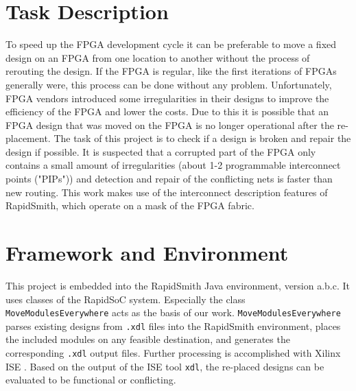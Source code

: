 \section{Task Description}
\label{sec:taskdescription}
To speed up the FPGA development cycle it can be preferable to move a fixed design on an FPGA from one location to another without the process of rerouting the design. If the FPGA is regular, like the first iterations of FPGAs generally were, this process can be done without any problem. Unfortunately, FPGA vendors introduced some irregularities in their designs to improve the efficiency of the FPGA and lower the costs. 
Due to this it is possible that an FPGA design that was moved on the FPGA is no longer operational after the re-placement.
The task of this project is to check if a design is broken and repair the design if possible.
It is suspected that a corrupted part of the FPGA only contains a small amount of irregularities (about 1-2 programmable interconnect points ("PIPs")) and detection and repair of the conflicting nets is faster than new routing. This work makes use of the interconnect description features of RapidSmith, which operate on a mask of the FPGA fabric.

\section{Framework and Environment}
\label{sec:frameworkandenvironment}

This project is embedded into the RapidSmith Java environment, version a.b.c. It uses classes of the RapidSoC system. Especially the class \texttt{MoveModulesEverywhere} acts as the basis of our work. \texttt{MoveModulesEverywhere} parses existing designs from \texttt{.xdl} files into the RapidSmith environment, places the included modules on any feasible destination, and generates the corresponding \texttt{.xdl} output files. Further processing is accomplished with Xilinx ISE \cite{ise}. Based on the output of the ISE tool \texttt{xdl}, the re-placed designs can be evaluated to be functional or conflicting.


